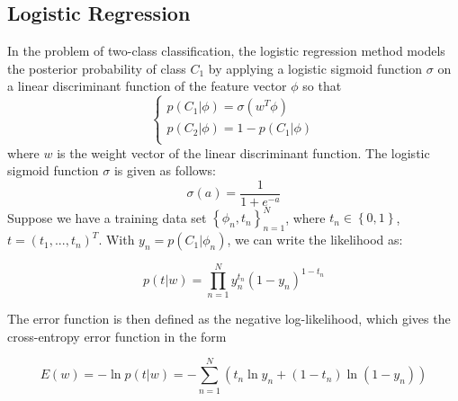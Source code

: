 \documentclass{SMBV12}
\begin{document}
\subsection{Logistic Regression}
\label{sec:logistic_regression}
In the problem of two-class classification, the logistic regression method models the posterior probability of class $C_1$ by applying a logistic sigmoid function $\sigma$ on a linear discriminant function of the feature vector $\phi$ so that
\begin{equation}
\label{eq:logistic}
\begin{cases}
	p(C_1|\phi) = \sigma(w^T\phi) \\
	p(C_2|\phi) = 1 - p(C_1|\phi) \\
\end{cases}
\end{equation}
where $w$ is the weight vector of the linear discriminant function. The logistic sigmoid function $\sigma$ is given as follows:
\begin{equation}
\label{eq:Bayes}
\sigma(a) = \dfrac{1}{1 + e^{-a}} 
\end{equation}
Suppose we have a training data set $\left\lbrace \phi_n, t_n \right\rbrace_{n = 1}^N$, where $t_n \in \left\lbrace 0, 1 \right\rbrace$, $t = (t_1, ..., t_n)^T$. With $y_n = p(C_1|\phi_n)$, we can write the likelihood as:

\begin{equation}
p(t|w) = \prod\limits_{n = 1}^{N}y_n^{t_n} (1 - y_n)^{1 - t_n}
\end{equation}

The error function is then defined as the negative log-likelihood, which gives the cross-entropy error function in the form

\begin{equation}
E(w) = - \ln p(t|w) = - \sum\limits_{n = 1}^{N} \left( t_n \ln y_n + (1 - t_n) \ln(1 - y_n) \right)
\end{equation}
\end{document}
